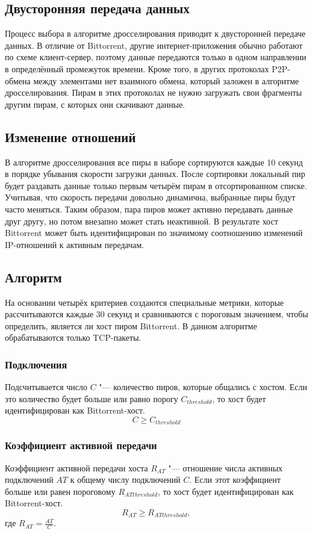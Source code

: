 \documentclass[bachelor, och, coursework]{SCWorks}
\begin{document}
\subsection{Двусторонняя передача данных}
Процесс выбора в алгоритме дросселирования приводит к двусторонней передаче данных. В отличие от Bittorrent, другие 
интернет-приложения обычно работают по схеме клиент-сервер, поэтому данные передаются только в одном направлении в 
определённый промежуток времени. Кроме того, в других протоколах P2P-обмена между элементами нет взаимного обмена,
который заложен в алгоритме дросселирования. Пирам в этих протоколах не нужно загружать свои фрагменты другим пирам,
с которых они скачивают данные. 

\subsection{Изменение отношений}
В алгоритме дросселирования все пиры в наборе сортируются каждые 10 секунд в порядке убывания скорости загрузки данных.
После сортировки локальный пир будет раздавать данные только первым четырём пирам в отсортированном списке.
Учитывая, что скорость передачи довольно динамична, выбранные пиры будут часто меняться. Таким образом, пара пиров
может активно передавать данные друг другу, но потом внезапно может стать неактивной. В результате хост Bittorrent может
быть идентифицирован по значимому соотношению изменений IP-отношений к активным передачам.

\subsection{Алгоритм}
На основании четырёх критериев создаются специальные метрики, которые рассчитываются каждые 30 секунд
и сравниваются с пороговым значением, чтобы определить, является ли хост пиром Bittorrent. В данном алгоритме
обрабатываются только TCP-пакеты. 

\subsubsection{Подключения}
Подсчитывается число $C$ "--- количество пиров, которые общались с хостом. Если это количество будет больше или равно порогу $C_{threshold}$, то хост будет идентифицирован как Bittorrent-хост.
\[ C \geq C_{threshold} \]

\subsubsection{Коэффициент активной передачи}
Коэффициент активной передачи хоста $R_{AT}$ "--- отношение числа активных подключений $AT$ к общему числу подключений $C$.
Если этот коэффициент больше или равен пороговому $R_{ATthreshold}$, то хост будет идентифицирован как Bittorrent-хост.
\[ R_{AT} \geq R_{ATthreshold}, \]
где $R_{AT} = \frac{AT}{C}$.
\end{document}
